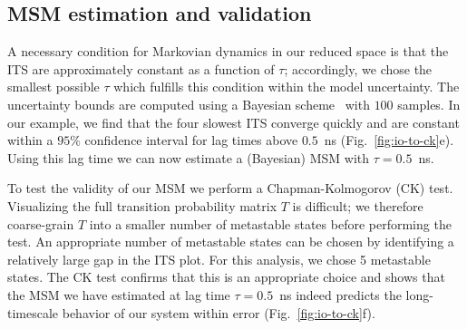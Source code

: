 \documentclass[9pt,tutorial]{livecoms}
\begin{document}
\subsection{MSM estimation and validation}
A necessary condition for Markovian dynamics in our reduced space is that the ITS are approximately constant as a function of $\tau$; accordingly, we chose the smallest possible $\tau$ which fulfills this condition within the model uncertainty. The uncertainty bounds are computed using a Bayesian scheme~\cite{ben-rev-msm,noe-tmat-sampling} with $100$ samples.
In our example, we find that the four slowest ITS converge quickly and are constant within a $95\%$ confidence interval for lag times above $0.5$~ns (Fig.~\ref{fig:io-to-ck}e). Using this lag time we can now estimate a (Bayesian) MSM with $\tau=0.5$~ns. 

To test the validity of our MSM we perform a Chapman-Kolmogorov (CK) test.
Visualizing the full transition probability matrix $T$ is difficult; we therefore coarse-grain $T$ into a smaller number of metastable states before performing the test.
An appropriate number of metastable states can be chosen by identifying a relatively large gap in the ITS plot.
For this analysis, we chose 5 metastable states.
The CK test confirms that this is an appropriate choice and shows that the MSM we have estimated at lag time $\tau=0.5$~ns indeed predicts the long-timescale behavior of our system within error (Fig.~\ref{fig:io-to-ck}f).
\end{document}
